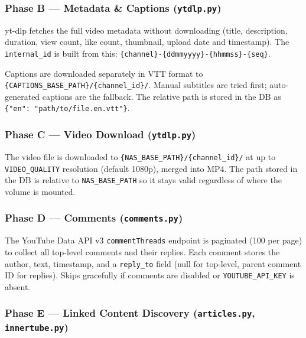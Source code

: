 \documentclass[
]{article}
\begin{document}
\subsubsection{\texorpdfstring{Phase B --- Metadata \& Captions
(\texttt{ytdlp.py})}{Phase B --- Metadata \& Captions (ytdlp.py)}}\label{phase-b--metadata--captions-ytdlppy}

yt-dlp fetches the full video metadata without downloading (title,
description, duration, view count, like count, thumbnail, upload date
and timestamp). The \texttt{internal\_id} is built from this:
\texttt{\{channel\}-\{ddmmyyyy\}-\{hhmmss\}-\{seq\}}.

Captions are downloaded separately in VTT format to
\texttt{\{CAPTIONS\_BASE\_PATH\}/\{channel\_id\}/}. Manual subtitles are
tried first; auto-generated captions are the fallback. The relative path
is stored in the DB as \texttt{\{"en":\ "path/to/file.en.vtt"\}}.

\subsubsection{\texorpdfstring{Phase C --- Video Download
(\texttt{ytdlp.py})}{Phase C --- Video Download (ytdlp.py)}}\label{phase-c--video-download-ytdlppy}

The video file is downloaded to
\texttt{\{NAS\_BASE\_PATH\}/\{channel\_id\}/} at up to
\texttt{VIDEO\_QUALITY} resolution (default 1080p), merged into MP4. The
path stored in the DB is relative to \texttt{NAS\_BASE\_PATH} so it
stays valid regardless of where the volume is mounted.

\subsubsection{\texorpdfstring{Phase D --- Comments
(\texttt{comments.py})}{Phase D --- Comments (comments.py)}}\label{phase-d--comments-commentspy}

The YouTube Data API v3 \texttt{commentThreads} endpoint is paginated
(100 per page) to collect all top-level comments and their replies. Each
comment stores the author, text, timestamp, and a \texttt{reply\_to}
field (null for top-level, parent comment ID for replies). Skips
gracefully if comments are disabled or \texttt{YOUTUBE\_API\_KEY} is
absent.

\subsubsection{\texorpdfstring{Phase E --- Linked Content Discovery
(\texttt{articles.py},
\texttt{innertube.py})}{Phase E --- Linked Content Discovery (articles.py, innertube.py)}}\label{phase-e--linked-content-discovery-articlespy-innertubepy}
\end{document}
